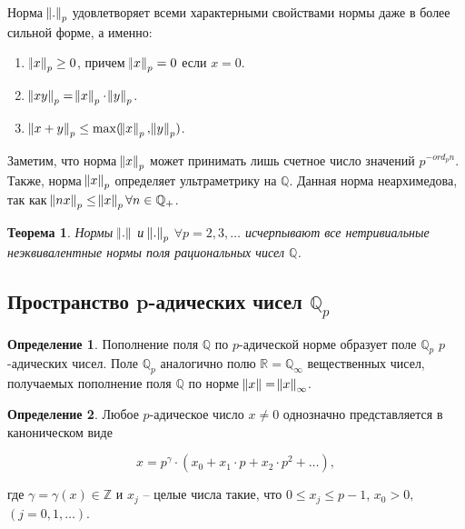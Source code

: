 \documentclass[master, och, diploma, times]{sty/SCWorks}
\theoremstyle{plain}
\newtheorem{thethm}{Теорема}[section]
\theoremstyle{definition}
\newtheorem{defn}{Определение}[section]
\numberwithin{equation}{section}
\begin{document}
Норма $\norm{.}_p$  удовлетворяет всеми характерными свойствами нормы даже в более сильной форме, а именно:

\begin{enumerate} 
	\item $\norm{x}_p \ge 0$, причем $\norm{x}_p = 0$ если $x = 0$.
	\item $\norm{xy}_p = \norm{x}_p \cdot \norm{y}_p$.
	\item $\norm{x + y}_p \le \max(\norm{x}_p, \norm{y}_p)$. \cite{bib:analysis:volovich}
\end{enumerate}

Заметим, что норма $\norm{x}_p$ может принимать лишь счетное число значений $p ^ {-ord_pn}$. Также, норма $\norm{x}_p$ определяет ультраметрику на $\mathbb {Q}$. Данная норма неархимедова, так как $\norm{nx}_p \le \norm{x}_p \forall n \in \mathbb {Q}_{+}$.

\begin{thethm}
	Нормы $\norm{.}$ и $\norm{.}_p$ $\forall p = 2, 3, \dots$ исчерпывают все нетривиальные неэквивалентные нормы поля рациональных чисел $\mathbb {Q}$.
\end{thethm}


\subsection{Пространство p-адических чисел $\mathbb {Q}_p$}

\begin{defn}
Пополнение поля $\mathbb {Q}$ по $p$-адической норме образует поле $\mathbb {Q}_p$ $p$-адических чисел. Поле $\mathbb {Q}_p$ аналогично полю $\mathbb {R} = \mathbb {Q}_{\infty}$ вещественных чисел, получаемых пополнение поля $\mathbb {Q}$ по норме $\norm{x}=\norm{x}_{\infty}$.
\end{defn}


\begin{defn}
Любое $p$-адическое число $x \ne 0$ однозначно представляется в каноническом виде

\begin{equation} \label{numbers:decomposition}
	x = p^{\gamma} \cdot (x_0 + x_1\cdot p + x_2 \cdot p^2 + \dots),
\end{equation}

\noindent где $\gamma = \gamma(x) \in \mathbb {Z}$ и $x_j$ -- целые числа такие, что $0 \le x_j \le p-1$, $x_0 > 0,$ \linebreak $(j=0,1,\dots)$. 
\end{defn}
\end{document}
